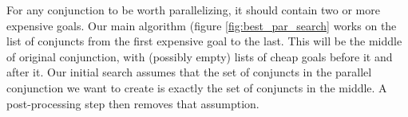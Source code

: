 For any conjunction to be worth parallelizing,
it should contain two or more expensive goals.
Our main algorithm (figure \ref{fig:best_par_search} works on the list
of conjuncts
from the first expensive goal to the last.
This will be the middle of original conjunction,
with (possibly empty) lists of cheap goals before it and after it.
Our initial search assumes that
the set of conjuncts in the parallel conjunction we want to create
is exactly the set of conjuncts in the middle.
A post-processing step then removes that assumption.





